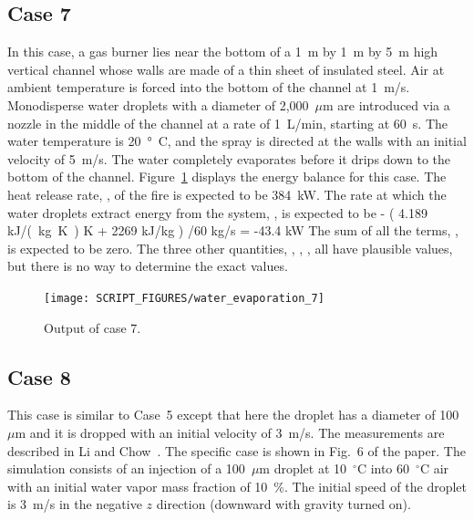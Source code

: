 \documentclass[11pt]{book}
\begin{document}
\subsection{Case 7}
\label{water_evaporation_7}

In this case, a gas burner lies near the bottom of a 1~m by 1~m by 5~m high vertical channel whose walls are made of a thin sheet of insulated steel. Air at ambient temperature is forced into the bottom of the channel at 1~m/s. Monodisperse water droplets with a diameter of 2,000~$\mu$m are
introduced via a nozzle in the middle of the channel at a rate of 1~L/min, starting at 60~s. The water temperature is 20~\si{\degree C}, and the spray is directed at the walls with an initial velocity of 5~m/s.
The water completely evaporates before it drips down to the bottom of the channel.
Figure~\ref{water_evaporation_7_plot} displays the energy balance for this case. The heat release rate, , of the fire is expected to be 384~kW. The rate at which the water droplets extract energy from the system, , is expected to be
\be - \left( 4.189 \; \hbox{\si{kJ/(kg.K)}}  \; \hbox{K} + 2269 \; \hbox{kJ/kg} \right) /60 \; \hbox{kg/s} = -43.4 \; \hbox{kW} \ee
The sum of all the terms, , is expected to be zero. The three other quantities, , , , all have plausible values, but there is no way to determine the exact values.

\begin{figure}[h!]
\centering
\texttt{[image: SCRIPT\_FIGURES/water\_evaporation\_7]}
\caption[Sample case ]{Output of  case 7.}
\label{water_evaporation_7_plot}
\end{figure}


\subsection{Case 8}
\label{water_evaporation_8}

This case is similar to Case~5 except that here the droplet has a diameter of 100~$\mu$m and it is dropped with an initial velocity of 3~m/s. The measurements are described in Li and Chow~\cite{LiChow:2008}. The specific case is shown in Fig.~6 of the paper. The simulation consists of an injection of a 100~$\mu$m droplet at 10~$^\circ$C into 60~$^\circ$C air with an initial water vapor mass fraction of 10~\%. The initial speed of the droplet is 3~m/s in the negative $z$ direction (downward with gravity turned on).
\end{document}
